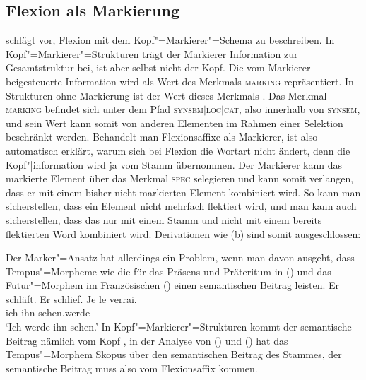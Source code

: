 \subsection{Flexion als Markierung}
\label{sec-flex-mark}

 schlägt vor, Flexion mit dem Kopf"=Markierer"=Schema
\citep[]{ps2} zu beschreiben. In Kopf"=Markierer"=Strukturen trägt der Markierer Information
zur Gesamtstruktur bei, ist aber selbst nicht der Kopf. Die vom Markierer beigesteuerte Information
wird als Wert des Merkmals \textsc{marking} repräsentiert. In Strukturen ohne
Markierung ist der Wert dieses Merkmals . Das Merkmal \textsc{marking} befindet sich
unter dem Pfad \textsc{synsem$|$loc$|$cat}, also innerhalb von \textsc{synsem}, und sein Wert kann somit
von anderen Elementen im Rahmen einer Selektion beschränkt werden. Behandelt man Flexionsaffixe als
Markierer, ist also automatisch erklärt, warum sich bei Flexion die Wortart nicht ändert, denn die
Kopf"|information wird ja vom Stamm übernommen. Der Markierer kann das markierte Element über das
Merkmal \textsc{spec} selegieren und kann somit verlangen, dass er mit einem bisher nicht markierten
Element kombiniert wird. So kann man sicherstellen, dass ein Element nicht mehrfach flektiert wird,
und man kann auch sicherstellen, dass \zb das \bars nur mit einem Stamm und nicht mit einem bereits
flektierten Word kombiniert wird.  Derivationen wie (b) sind somit ausgeschlossen:

\eal
{}
\zl

\noindent
Der Marker"=Ansatz hat allerdings ein Problem, wenn man davon ausgeht, dass Tempus"=Morpheme
wie die für das Präsens und Präteritum in () und das Futur"=Morphem im Französischen
() einen semantischen Beitrag leisten.
\eal
\ex Er schläft.
\ex Er schlief.
\zl
\ea
\gll Je le verrai.\\
     ich ihn sehen.werde\\
\glt `Ich werde ihn sehen.'
\z
\largerpage
In Kopf"=Markierer"=Strukturen kommt der semantische Beitrag nämlich vom Kopf \citep[]{ps2}, in der Analyse
von () und () hat das Tempus"=Morphem Skopus über den semantischen Beitrag des Stammes,
der semantische Beitrag muss also vom Flexionsaffix kommen.


